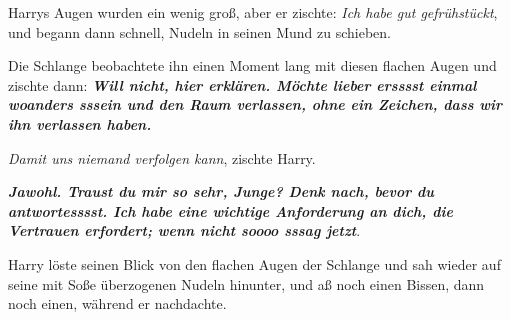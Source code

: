 Harrys Augen wurden ein wenig groß, aber er zischte: \glqq{}\emph{Ich habe gut
gefrühstückt}\grqq{}, und begann dann schnell, Nudeln in seinen Mund zu
schieben.

Die Schlange beobachtete ihn einen Moment lang mit diesen flachen Augen und
zischte dann: \glqq{}\textbf{\emph{Will nicht, hier erklären. Möchte lieber
ersssst einmal woanders sssein und den Raum verlassen, ohne ein Zeichen, dass
wir ihn verlassen haben.}}\grqq{}

\glqq{}\emph{Damit uns niemand verfolgen kann}\grqq{}, zischte Harry.

\glqq{}\textbf{\emph{Jawohl. Traust du mir so sehr, Junge? Denk nach, bevor du
antwortesssst. Ich habe eine wichtige Anforderung an dich, die Vertrauen
erfordert; wenn nicht soooo sssag jetzt}}.\grqq{}

Harry löste seinen Blick von den flachen Augen der Schlange und sah wieder auf
seine mit Soße überzogenen Nudeln hinunter, und aß noch einen Bissen, dann noch
einen, während er nachdachte.

